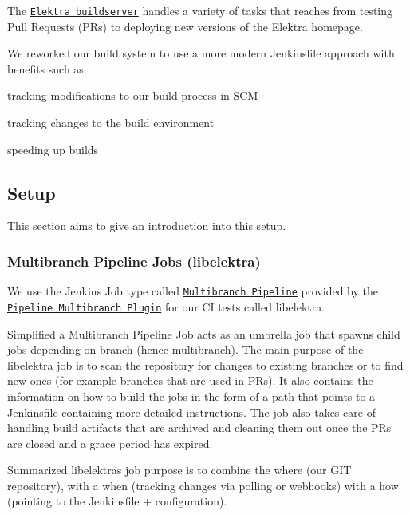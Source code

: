 The \href{https://build.libelektra.org/}{\tt Elektra buildserver} handles a variety of tasks that reaches from testing Pull Requests (P\+Rs) to deploying new versions of the Elektra homepage.

We reworked our build system to use a more modern Jenkinsfile approach with benefits such as


\begin{DoxyItemize}
\item tracking modifications to our build process in S\+CM
\item tracking changes to the build environment
\item speeding up builds
\end{DoxyItemize}

\subsection*{Setup}

This section aims to give an introduction into this setup.

\subsubsection*{Multibranch Pipeline Jobs (libelektra)}

We use the Jenkins Job type called \href{https://jenkins.io/doc/book/pipeline/multibranch/#creating-a-multibranch-pipeline}{\tt Multibranch Pipeline} provided by the \href{https://wiki.jenkins.io/display/JENKINS/Pipeline+Multibranch+Plugin}{\tt Pipeline Multibranch Plugin} for our CI tests called {\ttfamily libelektra}.

Simplified a Multibranch Pipeline Job acts as an umbrella job that spawns child jobs depending on branch (hence multibranch). The main purpose of the libelektra job is to scan the repository for changes to existing branches or to find new ones (for example branches that are used in PR\textquotesingle{}s). It also contains the information on how to build the jobs in the form of a path that points to a Jenkinsfile containing more detailed instructions. The job also takes care of handling build artifacts that are archived and cleaning them out once the PR\textquotesingle{}s are closed and a grace period has expired.

Summarized libelektra\textquotesingle{}s job purpose is to combine the where (our G\+IT repository), with a when (tracking changes via polling or webhooks) with a how (pointing to the Jenkinsfile + configuration).

